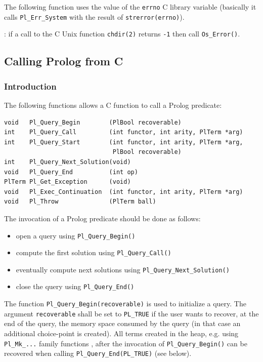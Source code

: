 The following function uses the value of the \texttt{errno} C library
variable (basically it calls \texttt{Pl\_Err\_System} with the result
of \texttt{strerror(errno)}).


: if a call to the C Unix function \texttt{chdir(2)} returns
\texttt{-1} then call \texttt{Os\_Error()}.


\subsection{Calling Prolog from C}

\subsubsection{Introduction}
The following functions allows a C function to call a Prolog predicate:

\begin{Code}
\begin{verbatim}
void   Pl_Query_Begin        (PlBool recoverable)
int    Pl_Query_Call         (int functor, int arity, PlTerm *arg)
int    Pl_Query_Start        (int functor, int arity, PlTerm *arg,
                              PlBool recoverable)
int    Pl_Query_Next_Solution(void)
void   Pl_Query_End          (int op)
PlTerm Pl_Get_Exception      (void)
void   Pl_Exec_Continuation  (int functor, int arity, PlTerm *arg)
void   Pl_Throw              (PlTerm ball)
\end{verbatim}
\end{Code}

The invocation of a Prolog predicate should be done as follows:

\begin{itemize}

\item open a query using \texttt{Pl\_Query\_Begin()}

\item compute the first solution using \texttt{Pl\_Query\_Call()}

\item eventually compute next solutions using
\texttt{Pl\_Query\_Next\_Solution()}

\item close the query using \texttt{Pl\_Query\_End()}

\end{itemize}

The function \texttt{Pl\_Query\_Begin(recoverable)} is used to initialize a
query. The argument \texttt{recoverable} shall be set to \texttt{PL\_TRUE} if
the user wants to recover, at the end of the query, the memory space consumed
by the query (in that case an additional choice-point is created). All terms
created in the heap, e.g. using \texttt{Pl\_Mk\_...}  family functions
, after the invocation of
\texttt{Pl\_Query\_Begin()} can be recovered when calling
\texttt{Pl\_Query\_End(PL\_TRUE)} (see below).

